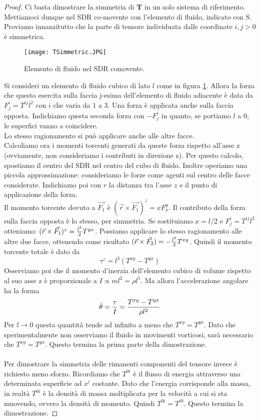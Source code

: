 \documentclass[]{report}
\theoremstyle{definition}
\theoremstyle{Theorem}
\theoremstyle{definition}
\theoremstyle{definition}
\theoremstyle{definition}
\begin{document}
\begin{proof}
	Ci basta dimostrare la simmetria di $\textbf{T}$ in un solo sistema di riferimento. Mettiamoci dunque nel SDR co-movente con l'elemento di fluido, indicato con S. Proviamo innanzitutto che la parte di tensore individuata dalle coordinate $i,j>0$ è simmetrica.
		\begin{figure} [H]
			\centering
			\label{Image 1}
			\texttt{[image: TSimmetric.JPG]}
	\caption{Elemento di fluido nel SDR comovente.}	
	\end{figure}
	Si consideri un elemento di fluido cubico di lato $l$ come in figura \ref{Image 1}. Allora la forza che questo esercita sulla faccia j-esima dell'elemento di fluido adiacente è data da $F^i_j=T^{ij}l^2$ con $i$ che varia da $1$ a 3. Una forza è applicata anche sulla faccia opposta. Indichiamo questa seconda forza con $-F^i_j$ in quanto, se portiamo $l$ a 0, le superfici vanno a coincidere.\\
	Lo stesso ragionamento si può applicare anche alle altre facce. \\
	Calcoliamo ora i momenti torcenti generati da queste forza rispetto all'asse z (ovviamente, non consideriamo i contributi in direzione z). Per questo calcolo, spostiamo il centro del SDR nel centro del cubo di fluido. Inoltre operiamo una piccola approssimazione: consideriamo le forze come agenti sul centro delle facce considerate. Indichiamo poi con $r$ la distanza tra l'asse $z$ e il punto di applicazione della forza.\\
	Il momento torcente dovuto a $\vec{F_1}$ è $(\vec{r}\times\vec{F_1})^z=xF_x^y$. Il contributo della forza sulla faccia opposta è lo stesso, per simmetria.
	Se sostituiamo $x=l/2$ e $F^i_j=T^{ij}l^2$ otteniamo:
	$(\vec{r}\times\vec{F_1})^z={l^3\over 2}T^{yx}$. Possiamo applicare lo stesso ragionamento alle altre due facce, ottenendo come risultato $(\vec{r}\times\vec{F_2})=-{l^3\over 2}T^{xy}$. Quindi il momento torcente totale è dato da $$\tau^z=l^3(T^{xy}-T^{yx})$$
	Osserviamo poi che il momento d'inerzia dell'elemento cubico di volume rispetto al suo asse z è proporzionale a $I\propto ml^2=\rho l^5$. Ma allora l'accelerazione angolare ha la forma $$\ddot{\theta}={\tau\over I}={T^{xy}-T^{yx}\over \rho l^2}$$
	Per $l\rightarrow 0$ questa quantità tende ad infinito a meno che $T^{xy}=T^{yx}$. Dato che sperimentalmente non osserviamo il fluido in movimenti vorticosi, sarà necessario che $T^{xy}=T^{yx}$. Questo termina la prima parte della dimostrazione.\\
	\\
	Per dimostrare la simmetria delle rimanenti componenti del tensore invece è richiesto meno sforzo. Ricordiamo che $T^{0i}$ è il flusso di energia attraverso una determinata superficie ad $x^i$ costante. Dato che l'energia corrisponde alla massa, in realtà $T^{0i}$ è la densità di massa moltiplicata per la velocità a cui si sta muovendo, ovvero la densità di momento. Quindi $T^{0i}=T^{i0}$.
	Questo termina la dimostrazione.
\end{proof}
\end{document}
